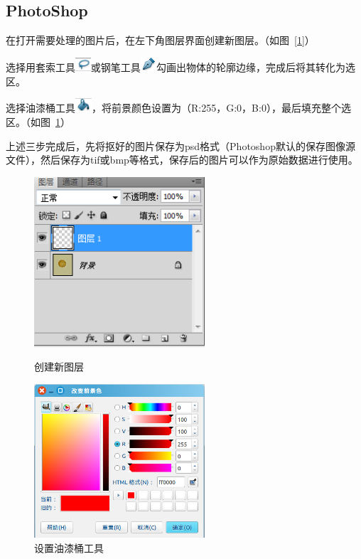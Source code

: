 \documentclass[12pt]{article}
\begin{document}
\subsection*{PhotoShop}
\begin{enumerate*}
\item 在打开需要处理的图片后，在左下角图层界面创建新图层。（如图~\ref{1}）
\item 选择用套索工具\includegraphics[height=0.2in]{taosuo.png}或钢笔工具\includegraphics[height=0.2in]{gangbi.png}勾画出物体的轮廓边缘，完成后将其转化为选区。


\item 选择油漆桶工具\includegraphics[height=0.2in]{youqitong2.png}，将前景颜色设置为（R:255，G:0，B:0），最后填充整个选区。（如图~\ref{2}）
\item 上述三步完成后，先将抠好的图片保存为psd格式（Photoshop默认的保存图像源文件），然后保存为tif或bmp等格式，保存后的图片可以作为原始数据进行使用。
\end{enumerate*}

\begin{figure}[htbp]
\begin{minipage}{0.5\textwidth}
\centering
\includegraphics[width=2.5in]{xinjiantuceng.png}
\caption{创建新图层}
\label{1}
\end{minipage}
\begin{minipage}{0.5\textwidth}
\centering
\includegraphics[width=2.5in]{qianjing.png}
\caption{设置油漆桶工具}
\label{2}
\end{minipage}
\end{figure}
\end{document}
